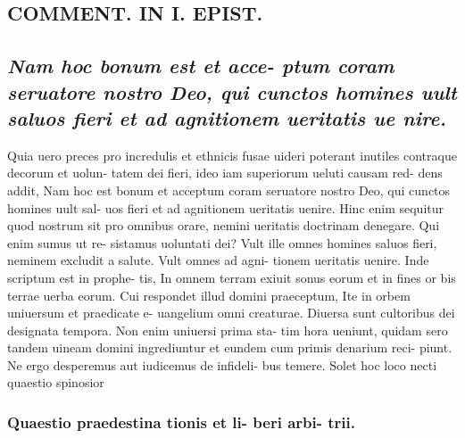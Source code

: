 \documentclass{article}
\begin{document}
\begin{pages}
\section*{COMMENT. IN I. EPIST. } 
{}
\subsection*{\textit{Nam hoc bonum est et acce- ptum coram seruatore nostro Deo, qui cunctos homines uult saluos fieri et ad agnitionem ueritatis ue nire. }}\pstart Quia uero preces pro incredulis et ethnicis fusae uideri poterant inutiles contraque decorum et uolun- tatem dei fieri, ideo iam superiorum ueluti causam red- dens addit, Nam hoc est bonum et acceptum coram seruatore nostro Deo, qui cunctos homines uult sal- uos fieri et ad agnitionem ueritatis uenire. Hinc enim sequitur quod nostrum sit pro omnibus orare, nemini ueritatis doctrinam denegare. Qui enim sumus ut re- sistamus uoluntati dei? Vult ille omnes homines saluos fieri, neminem excludit a salute. Vult omnes ad agni- tionem ueritatis uenire. Inde scriptum est in prophe- tis, In omnem terram exiuit sonus eorum et in fines or bis terrae uerba eorum. Cui respondet illud domini praeceptum, Ite in orbem uniuersum et praedicate e- uangelium omni creaturae. Diuersa sunt cultoribus dei designata tempora. Non enim uniuersi prima sta- tim hora ueniunt, quidam sero tandem uineam domini ingrediuntur et eundem cum primis denarium reci- piunt. Ne ergo desperemus aut iudicemus de infideli- bus temere. Solet hoc loco necti quaestio spinosior  \pend
\subsubsection*{Quaestio praedestina tionis et li- beri arbi- trii. }

\end{pages}
\end{document}
